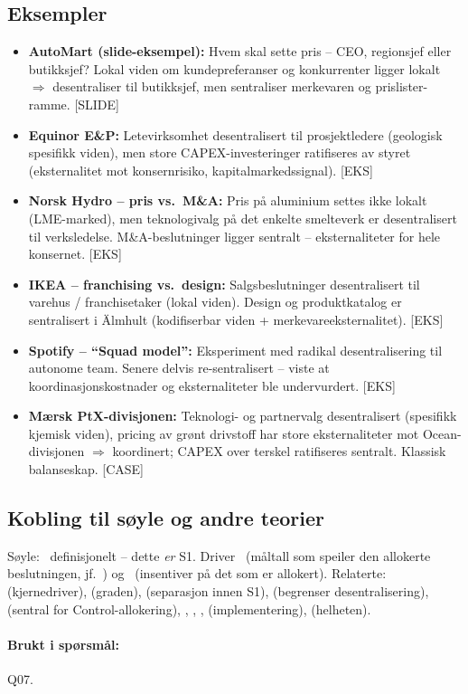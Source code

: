 \subsection*{Eksempler}
\begin{itemize}
\item \textbf{AutoMart (slide-eksempel):} Hvem skal sette pris -- CEO, regionsjef eller butikksjef? Lokal viden om kundepreferanser og konkurrenter ligger lokalt $\Rightarrow$ desentraliser til butikksjef, men sentraliser merkevaren og prislister-ramme. [SLIDE]
\item \textbf{Equinor E\&P:} Letevirksomhet desentralisert til prosjektledere (geologisk spesifikk viden), men store CAPEX-investeringer ratifiseres av styret (eksternalitet mot konsernrisiko, kapitalmarkedssignal). [EKS]
\item \textbf{Norsk Hydro -- pris vs.\ M\&A:} Pris på aluminium settes ikke lokalt (LME-marked), men teknologivalg på det enkelte smelteverk er desentralisert til verksledelse. M\&A-beslutninger ligger sentralt -- eksternaliteter for hele konsernet. [EKS]
\item \textbf{IKEA -- franchising vs.\ design:} Salgsbeslutninger desentralisert til varehus / franchisetaker (lokal viden). Design og produktkatalog er sentralisert i Älmhult (kodifiserbar viden + merkevareeksternalitet). [EKS]
\item \textbf{Spotify -- ``Squad model'':} Eksperiment med radikal desentralisering til autonome team. Senere delvis re-sentralisert -- viste at koordinasjonskostnader og eksternaliteter ble undervurdert. [EKS]
\item \textbf{Mærsk PtX-divisjonen:} Teknologi- og partnervalg desentralisert (spesifikk kjemisk viden), pricing av grønt drivstoff har store eksternaliteter mot Ocean-divisjonen $\Rightarrow$ koordinert; CAPEX over terskel ratifiseres sentralt. Klassisk balanseskap. [CASE]
\end{itemize}

\subsection*{Kobling til søyle og andre teorier}
Søyle: \SOne\ definisjonelt -- dette \emph{er} S1. Driver \STwo\ (måltall som speiler den allokerte beslutningen, jf.\ ) og \SThree\ (insentiver på det som er allokert). Relaterte:  (kjernedriver),  (graden),  (separasjon innen S1),  (begrenser desentralisering),  (sentral for Control-allokering), , , ,  (implementering),  (helheten).

\paragraph{Brukt i spørsmål:} Q07.
